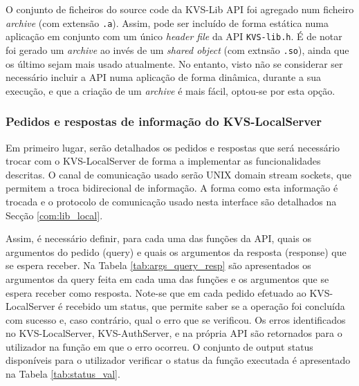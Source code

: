 O conjunto de ficheiros do source code da KVS-Lib API foi agregado num ficheiro \textit{archive} (com extensão \texttt{.a}). Assim, pode ser incluído de forma estática numa aplicação em conjunto com um único \textit{header file} da API \texttt{KVS-lib.h}. É de notar foi gerado um \textit{archive} ao invés de um \textit{shared object} (com extnsão \texttt{.so}), ainda que os último sejam mais usado atualmente. No entanto, visto não se considerar ser necessário incluir a API numa aplicação de forma dinâmica, durante a sua execução, e que a criação de um \textit{archive} é mais fácil, optou-se por esta opção.


\subsubsection{Pedidos e respostas de informação do KVS-LocalServer}
Em primeiro lugar, serão detalhados os pedidos e respostas que será necessário trocar com o KVS-LocalServer de forma a implementar as funcionalidades descritas. O canal de comunicação usado serão UNIX domain stream sockets, que permitem a troca bidirecional de informação. A forma como esta informação é trocada e o protocolo de comunicação usado nesta interface são detalhados na Secção \ref{com:lib_local}.

Assim, é necessário definir, para cada uma das funções da API, quais os argumentos do pedido (query) e quais os argumentos da resposta (response) que se espera receber.  Na Tabela \ref{tab:args_query_resp} são apresentados os argumentos da query feita em cada uma das funções e os argumentos que se espera receber como resposta. Note-se que em cada pedido efetuado ao KVS-LocalServer é recebido um status, que permite saber se a operação foi concluída com sucesso e, caso contrário, qual o erro que se verificou. Os erros identificados no KVS-LocalServer, KVS-AuthServer, e na própria API são retornados para o utilizador na função em que o erro ocorreu. O conjunto de output status disponíveis para o utilizador verificar o status da função executada é apresentado na Tabela \ref{tab:status_val}.

